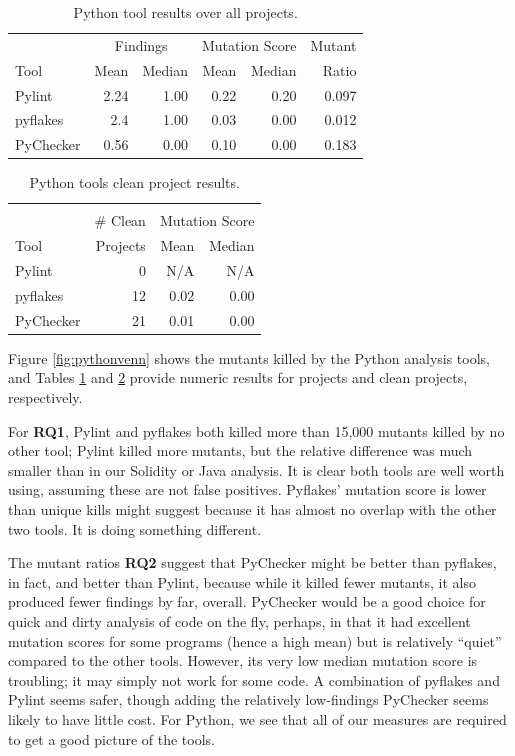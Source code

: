 \begin{table}
  \begin{tabular}{l|r|r|r|r|r}
    & \multicolumn{2}{|c|}{Findings} & \multicolumn{2}{|c|}{Mutation Score}  & Mutant \\
    Tool & Mean & Median & Mean & Median & Ratio\\
    \hline
    \hline
    Pylint & 2.24 & 1.00 & 0.22 & 0.20 & 0.097 \\
    \hline
    pyflakes & 2.4 & 1.00 & 0.03 & 0.00 & 0.012 \\
    \hline
    PyChecker & 0.56& 0.00 & 0.10 & 0.00 &  0.183 \\
    \hline
  \end{tabular}
  \caption{Python tool results over all projects.}
  \label{tab:scorepython}
\end{table}

\begin{table}
  \begin{tabular}{l|r|r|r}
    & & \multicolumn{2}{|c|}{} \\
    & \# Clean & \multicolumn{2}{|c|}{Mutation Score} \\
    Tool & Projects & Mean & Median \\
    \hline
    \hline
    Pylint & 0 & N/A & N/A \\
    \hline
    pyflakes & 12 & 0.02 & 0.00 \\
    \hline
    PyChecker & 21& 0.01 & 0.00 \\
    \hline
  \end{tabular}
  \caption{Python tools clean project results.}
  \label{tab:cleanpython}
\end{table}


Figure \ref{fig:pythonvenn} shows the mutants killed by the Python analysis tools, and Tables \ref{tab:scorepython} and \ref{tab:cleanpython} provide numeric results for projects and clean projects, respectively.

For {\bf RQ1}, Pylint and pyflakes both killed more than 15,000 mutants killed by no other tool; Pylint killed more mutants, but the relative difference was much smaller than in our Solidity or Java analysis.  It is clear both tools are well worth using, assuming these are not false positives.  Pyflakes' mutation score is lower than unique kills might suggest because it has almost no overlap with the other two tools.  It is doing something different.

The mutant ratios {\bf RQ2} suggest that PyChecker might be better than pyflakes, in fact, and better than Pylint, because while it killed fewer mutants, it also produced fewer findings by far, overall.  PyChecker would be a good choice for quick and dirty analysis of code on the fly, perhaps, in that it had excellent mutation scores for some programs (hence a high mean) but is relatively ``quiet'' compared to the other tools.  However, its very low median mutation score is troubling; it may simply not work for some code.  A combination of pyflakes and Pylint seems safer, though adding the relatively low-findings PyChecker seems likely to have little cost.  For Python, we see that all of our measures are required to get a good picture of the tools.

